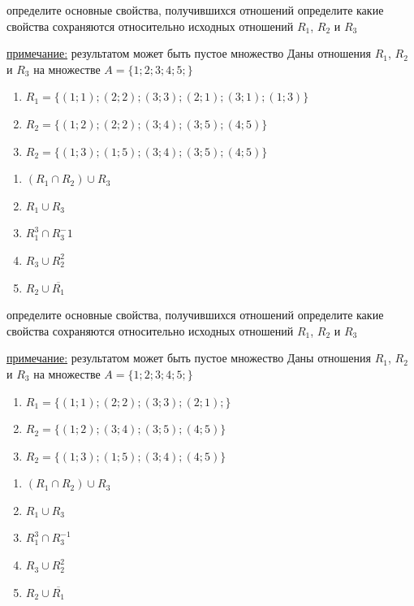 \documentclass[10pt]{exam}
\begin{document}
\begin{questions}
определите основные свойства, получившихся отношений
определите какие свойства сохраняются относительно исходных отношений $R_1$, $R_2$ и $R_3$ 

\underline{примечание:} результатом может быть пустое множество\question
Даны отношения $R_1$, $R_2$ и $R_3$ на множестве $A = \{1; 2; 3; 4; 5;\}$ 
\begin{enumerate}
	\renewcommand{\labelenumi}{\alph{enumi})}
	\item $R_1 = \{(1; 1); (2; 2); (3; 3); (2; 1);  (3; 1); (1; 3)\}$
	\item $R_2 = \{(1; 2); (2; 2); (3; 4); (3; 5); (4; 5)\}$
	\item $R_2 = \{(1; 3); (1; 5); (3; 4); (3; 5); (4; 5)\}$
\end{enumerate}

\begin{enumerate}
	\renewcommand{\labelenumi}{\alph{enumi})}
	\item $(R_1 \cap R_2) \cup R_3$
	\item $R_1 \cup R_3$
	\item $R_1^3 \cap R_3^-1$
	\item $R_3 \cup R_2^2$
	\item $R_2 \cup \overline{R_1}$
\end{enumerate}

определите основные свойства, получившихся отношений
определите какие свойства сохраняются относительно исходных отношений $R_1$, $R_2$ и $R_3$ 

\underline{примечание:} результатом может быть пустое множество\question
Даны отношения $R_1$, $R_2$ и $R_3$ на множестве $A = \{1; 2; 3; 4; 5;\}$ 
\begin{enumerate}
	\renewcommand{\labelenumi}{\alph{enumi})}
	\item $R_1 = \{(1; 1); (2; 2); (3; 3); (2; 1);\}$
	\item $R_2 = \{(1; 2); (3; 4); (3; 5); (4; 5)\}$
	\item $R_2 = \{(1; 3); (1; 5); (3; 4); (4; 5)\}$
\end{enumerate}

\begin{enumerate}
	\renewcommand{\labelenumi}{\alph{enumi})}
	\item $(R_1 \cap R_2) \cup R_3$
	\item $R_1 \cup R_3$
	\item $R_1^3 \cap R_3^{-1}$
	\item $R_3 \cup R_2^2$
	\item $R_2 \cup \overline{R_1}$
\end{enumerate}


\end{questions}
\end{document}
